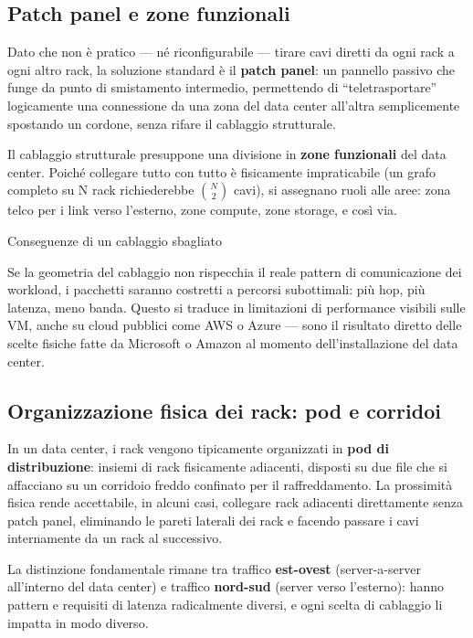 \documentclass[
  italian,
  openany]{book}
\begin{document}
\subsection{Patch panel e zone
funzionali}\label{patch-panel-e-zone-funzionali}

Dato che non è pratico --- né riconfigurabile --- tirare cavi diretti da
ogni rack a ogni altro rack, la soluzione standard è il \textbf{patch
panel}: un pannello passivo che funge da punto di smistamento
intermedio, permettendo di ``teletrasportare'' logicamente una
connessione da una zona del data center all'altra semplicemente
spostando un cordone, senza rifare il cablaggio strutturale.

Il cablaggio strutturale presuppone una divisione in \textbf{zone
funzionali} del data center. Poiché collegare tutto con tutto è
fisicamente impraticabile (un grafo completo su N rack richiederebbe
\(\binom{N}{2}\) cavi), si assegnano ruoli alle aree: zona telco per i
link verso l'esterno, zone compute, zone storage, e così via.

\begin{calloutwarning}{Conseguenze di un cablaggio sbagliato}

Se la geometria del cablaggio non rispecchia il reale pattern di
comunicazione dei workload, i pacchetti saranno costretti a percorsi
subottimali: più hop, più latenza, meno banda. Questo si traduce in
limitazioni di performance visibili sulle VM, anche su cloud pubblici
come AWS o Azure --- sono il risultato diretto delle scelte fisiche
fatte da Microsoft o Amazon al momento dell'installazione del data
center.

\end{calloutwarning}

\subsection{Organizzazione fisica dei rack: pod e
corridoi}\label{organizzazione-fisica-dei-rack-pod-e-corridoi}

In un data center, i rack vengono tipicamente organizzati in \textbf{pod
di distribuzione}: insiemi di rack fisicamente adiacenti, disposti su
due file che si affacciano su un corridoio freddo confinato per il
raffreddamento. La prossimità fisica rende accettabile, in alcuni casi,
collegare rack adiacenti direttamente senza patch panel, eliminando le
pareti laterali dei rack e facendo passare i cavi internamente da un
rack al successivo.

La distinzione fondamentale rimane tra traffico \textbf{est-ovest}
(server-a-server all'interno del data center) e traffico
\textbf{nord-sud} (server verso l'esterno): hanno pattern e requisiti di
latenza radicalmente diversi, e ogni scelta di cablaggio li impatta in
modo diverso.
\end{document}
